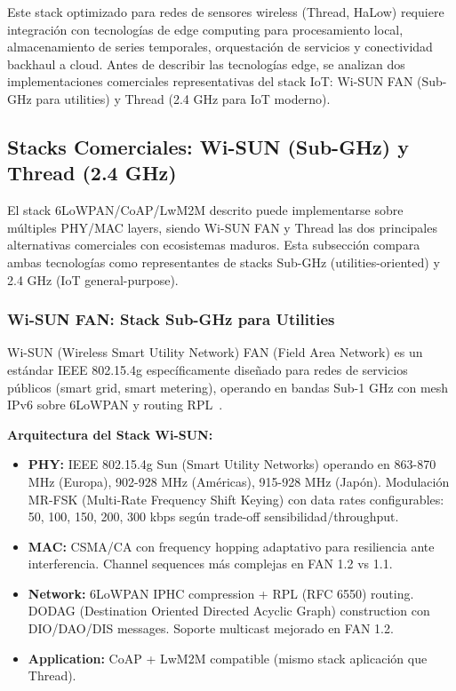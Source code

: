 Este stack optimizado para redes de sensores wireless (Thread, HaLow) requiere integración con tecnologías de edge computing para procesamiento local, almacenamiento de series temporales, orquestación de servicios y conectividad backhaul a cloud. Antes de describir las tecnologías edge, se analizan dos implementaciones comerciales representativas del stack IoT: Wi-SUN FAN (Sub-GHz para utilities) y Thread (2.4 GHz para IoT moderno).

\subsection{Stacks Comerciales: Wi-SUN (Sub-GHz) y Thread (2.4 GHz)}

El stack 6LoWPAN/CoAP/LwM2M descrito puede implementarse sobre múltiples PHY/MAC layers, siendo Wi-SUN FAN y Thread las dos principales alternativas comerciales con ecosistemas maduros. Esta subsección compara ambas tecnologías como representantes de stacks Sub-GHz (utilities-oriented) y 2.4 GHz (IoT general-purpose).

\subsubsection{Wi-SUN FAN: Stack Sub-GHz para Utilities}

Wi-SUN (Wireless Smart Utility Network) FAN (Field Area Network) es un estándar IEEE 802.15.4g específicamente diseñado para redes de servicios públicos (smart grid, smart metering), operando en bandas Sub-1 GHz con mesh IPv6 sobre 6LoWPAN y routing RPL~\cite{tiCC1312RWiSUN2024}.

\textbf{Arquitectura del Stack Wi-SUN:}
\begin{itemize}
    \item \textbf{PHY:} IEEE 802.15.4g Sun (Smart Utility Networks) operando en 863-870 MHz (Europa), 902-928 MHz (Américas), 915-928 MHz (Japón). Modulación MR-FSK (Multi-Rate Frequency Shift Keying) con data rates configurables: 50, 100, 150, 200, 300 kbps según trade-off sensibilidad/throughput.
    \item \textbf{MAC:} CSMA/CA con frequency hopping adaptativo para resiliencia ante interferencia. Channel sequences más complejas en FAN 1.2 vs 1.1.
    \item \textbf{Network:} 6LoWPAN IPHC compression + RPL (RFC 6550) routing. DODAG (Destination Oriented Directed Acyclic Graph) construction con DIO/DAO/DIS messages. Soporte multicast mejorado en FAN 1.2.
    \item \textbf{Application:} CoAP + LwM2M compatible (mismo stack aplicación que Thread).
\end{itemize}

